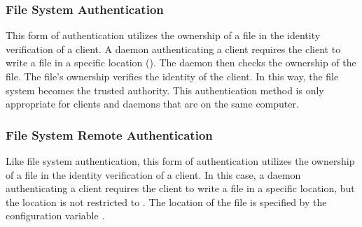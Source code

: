 \subsubsection{\label{sec:FS-Authentication}File System Authentication}

This form of authentication utilizes the ownership of a file
in the identity verification of a client.
A daemon authenticating a client requires the client to write
a file in a specific location ().
The daemon then checks the ownership of the file.
The file's ownership verifies the identity of the client.
In this way, the file system becomes the trusted authority.
This authentication method is only appropriate for clients and daemons
that are on the same computer. 

\subsubsection{\label{sec:FSR-Authentication}File System Remote Authentication}
Like file system authentication,
this form of authentication utilizes the ownership of a file
in the identity verification of a client.
In this case,
a daemon authenticating a client requires the client to write
a file in a specific location,
but the location is not restricted to .
The location of the file is specified by the configuration
variable .



